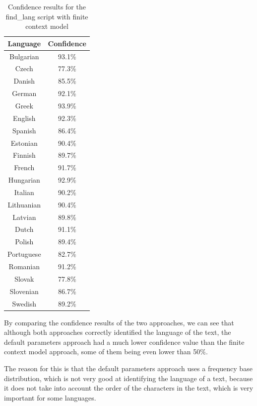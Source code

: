 \documentclass{article}
\begin{document}
\begin{table}[H]
    \centering
    \begin{tabular}{|c|c|}
        \hline
        Language & Confidence \\
        \hline
        Bulgarian & 93.1\% \\
        Czech & 77.3\% \\
        Danish & 85.5\% \\
        German & 92.1\% \\
        Greek & 93.9\% \\
        English & 92.3\% \\
        Spanish & 86.4\% \\
        Estonian & 90.4\% \\
        Finnish & 89.7\% \\
        French & 91.7\% \\
        Hungarian & 92.9\% \\
        Italian & 90.2\% \\
        Lithuanian & 90.4\% \\
        Latvian & 89.8\% \\
        Dutch & 91.1\% \\
        Polish & 89.4\% \\
        Portuguese & 82.7\% \\
        Romanian & 91.2\% \\
        Slovak & 77.8\% \\
        Slovenian & 86.7\% \\
        Swedish & 89.2\% \\
        \hline
    \end{tabular}
    \caption{Confidence results for the find_lang script with finite context model}
    \label{tab:find_lang_finite_context_confidence}
\end{table}

By comparing the confidence results of the two approaches, we can see that although both approaches correctly identified the language of the text,
the default parameters approach had a much lower confidence value than the finite context model approach, some of them being even lower than 50\%.

The reason for this is that the default parameters approach uses a frequency base distribution, which is not very good at identifying the language of a text,
because it does not take into account the order of the characters in the text, which is very important for some languages.
\end{document}
